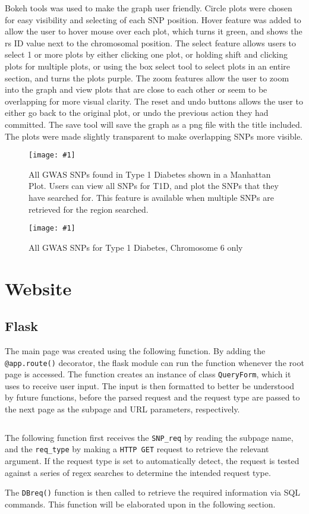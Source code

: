 \documentclass[12pt,a4paper]{article}
\newcommand{\mintfile}[1]{
\begin{tcolorbox}[colback=gray!5!white,%
	grow to left by=20mm,
    grow to right by=20mm,
    sharp corners]{{    \small \inputminted[breaklines]{python}{#1}		}}
\end{tcolorbox}}
\newcommand{\sect}[1]{
\clearpage
\hypertarget{#1}{
\section{#1}\label{#1}}
}
\newcommand{\subsect}[1]{
\FloatBarrier %
\hypertarget{#1}{
\subsection{#1}\label{#1}}
}
\newcommand{\pic}[2]{
\begin{figure}[h]
    \centering
    \captionsetup{justification=centering}
    \texttt{[image: \#1]}
    \caption{#2}
    \label{#1}
\end{figure}
}
\begin{document}
\mintfile{code_snippets/manPlot/createManPlot.py}
Bokeh tools was used to make the graph user friendly. Circle plots were chosen for easy visibility and selecting of each SNP position. Hover feature was added to allow the user to hover mouse over each plot, which turns it green, and shows the rs ID value next to the chromosomal position. The select feature allows users to select 1 or more plots by either clicking one plot, or holding shift and clicking plots for multiple plots, or using the box select tool to select plots in an entire section, and turns the plots purple. The zoom features allow the user to zoom into the graph and view plots that are close to each other or seem to be overlapping for more visual clarity. The reset and undo buttons allows the user to either go back to the original plot, or undo the previous action they had committed. The save tool will save the graph as a png file with the title included. The plots were made slightly transparent to make overlapping SNPs more visible.

\pic{manplot1}{All GWAS SNPs found in Type 1 Diabetes shown in a Manhattan Plot.
Users can view all SNPs for T1D, and plot the SNPs that they have searched for.
This feature is available when multiple SNPs are retrieved for the region searched.}

\pic{manplot2}{All GWAS SNPs for Type 1 Diabetes, Chromosome 6 only}

\sect{Website}

\subsect{Flask}

The main page was created using the following function. By adding the \verb|@app.route()| decorator,
the flask module can run the function whenever the root page is accessed.
The function creates an instance of class \texttt{QueryForm}, which it uses to receive user input.
The input is then formatted to better be understood by future functions,
before the parsed request and the request type are passed to the next page as the subpage and URL parameters, respectively.

\mintfile{code_snippets/flask/root.py}

The following function first receives the \texttt{SNP\_req} by reading the subpage name,
and the \texttt{req\_type} by making a \texttt{HTTP GET} request to retrieve the relevant argument.
If the request type is set to automatically detect, the request is tested against a series of
regex searches to determine the intended request type.

The \texttt{DBreq()} function is then called to retrieve the required information via SQL commands. This function will be elaborated upon in the following section.
\end{document}
